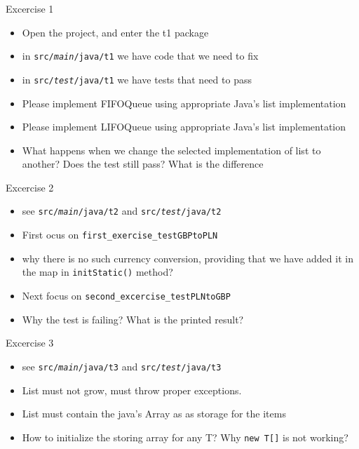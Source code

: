 \documentclass{beamer}
\begin{document}
\begin{frame}{Excercise 1}

\begin{itemize}
	\item Open the project, and enter the t1 package
    \item in \texttt{src/\textit{main}/java/t1} we have code that we need to fix
    \item in \texttt{src/\textit{test}/java/t1} we have tests that need to pass
    \item Please implement FIFOQueue using appropriate Java's list implementation
    \item Please implement LIFOQueue using appropriate Java's list implementation
    \item What happens when we change the selected implementation of list to another? Does the test still pass? What is the difference
\end{itemize}
\end{frame}

\begin{frame}{Excercise 2}

\begin{itemize}
    \item see \texttt{src/\textit{main}/java/t2} and \texttt{src/\textit{test}/java/t2}
    \item First ocus on \texttt{first\_exercise\_testGBPtoPLN}
    \item why there is no such currency conversion, providing that we have added it in the map in \texttt{initStatic()} method?
    \item Next focus on \texttt{second\_excercise\_testPLNtoGBP}
    \item Why the test is failing? What is the printed result?
\end{itemize}
\end{frame}

\begin{frame}{Excercise 3}

\begin{itemize}
    \item see \texttt{src/\textit{main}/java/t3} and \texttt{src/\textit{test}/java/t3}
    \item List must not grow, must throw proper exceptions.
    \item List must contain the java's Array as as storage for the items
    \item How to initialize the storing array for any T? Why \texttt{new T[]} is not working?
\end{itemize}
\end{frame}
\end{document}
